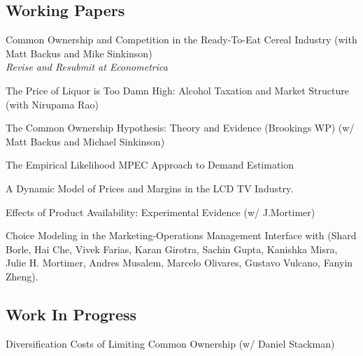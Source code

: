 \documentclass[letterpaper]{article}
\renewenvironment{itemize}{
  \begin{list}{}{
    \setlength{\leftmargin}{1.5em}
  }
}{
  \end{list}
}
\begin{document}
\subsection*{Working Papers}
\begin{itemize}
\item 
\item Common Ownership and Competition in the Ready-To-Eat Cereal Industry (with Matt Backus and Mike Sinkinson)  \\\textit{Revise and Resubmit at Econometrica} 


\item The Price of Liquor is Too Damn High: Alcohol Taxation and Market Structure (with Nirupama Rao)  
\item The Common Ownership Hypothesis: Theory and Evidence (Brookings WP) (w/ Matt Backus and Michael Sinkinson) 
\item The Empirical Likelihood MPEC Approach to Demand Estimation\\ %
\item A Dynamic Model of Prices and Margins in the LCD TV Industry. 
\item Effects of Product Availability: Experimental Evidence (w/ J.Mortimer) 
\item Choice Modeling in the Marketing-Operations Management Interface with (Shard Borle, 
Hai Che,
Vivek Farias,
Karan Girotra,
Sachin Gupta,
Kanishka Misra,
Julie H. Mortimer,
Andres Musalem,
Marcelo Olivares,
Gustavo Vulcano,
Fanyin Zheng). 
\end{itemize}

\subsection*{Work In Progress}
\begin{itemize}
\item Diversification Costs of Limiting Common Ownership (w/ Daniel Stackman)
\end{itemize}
\end{document}
